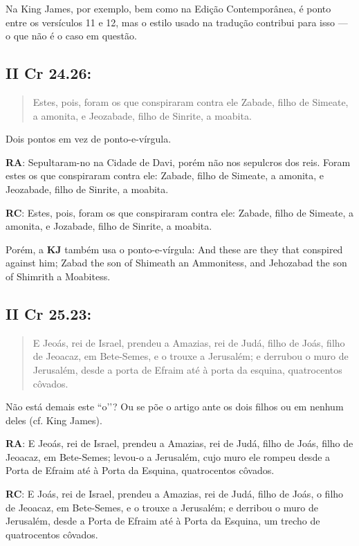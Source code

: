 Na King James, por exemplo, bem como na Edição Contemporânea, é ponto
entre os versículos 11 e 12, mas o estilo usado na tradução contribui
para isso --- o que não é o caso em questão.


\subsection*{II Cr 24.26:} 
\begin{quote}
    \small
Estes, pois, foram os que conspiraram contra ele\uwave{;} Zabade, filho de Simeate, a amonita, e Jeozabade, filho de Sinrite, a moabita.
\end{quote}
 
Dois pontos em vez de ponto-e-vírgula.

\textbf{RA}: Sepultaram-no na Cidade de Davi, porém não nos sepulcros dos reis. Foram estes os que conspiraram contra ele: Zabade, filho de Simeate, a amonita, e Jeozabade, filho de Sinrite, a moabita.

\textbf{RC}: Estes, pois, foram os que conspiraram contra ele: Zabade, filho de Simeate, a amonita, e Jozabade, filho de Sinrite, a moabita.

Porém, a \textbf{KJ} também usa o ponto-e-vírgula: And these are they that conspired against him; Zabad the son of Shimeath an Ammonitess, and Jehozabad the son of Shimrith a Moabitess. 

\subsection*{II Cr 25.23:} 
\begin{quote}
    \small
E Jeoás, rei de Israel, prendeu a Amazias, rei de Judá, filho de Joás,  filho de Jeoacaz, em Bete-Semes, e o trouxe a Jerusalém; e derrubou o muro de Jerusalém, desde a porta de Efraim até à porta da esquina, quatrocentos côvados.
\end{quote}
 
Não está demais este ``o’’? Ou se põe o artigo ante os dois filhos ou
em nenhum deles (cf. King James).

\textbf{RA}: E Jeoás, rei de Israel, prendeu a Amazias, rei de Judá, filho de Joás, filho de Jeoacaz, em Bete-Semes; levou-o a Jerusalém, cujo muro ele rompeu desde a Porta de Efraim até à Porta da Esquina, quatrocentos côvados.

\textbf{RC}: E Joás, rei de Israel, prendeu a Amazias, rei de Judá, filho de Joás, o filho de Jeoacaz, em Bete-Semes, e o trouxe a Jerusalém; e derribou o muro de Jerusalém, desde a Porta de Efraim até à Porta da Esquina, um trecho de quatrocentos côvados.

